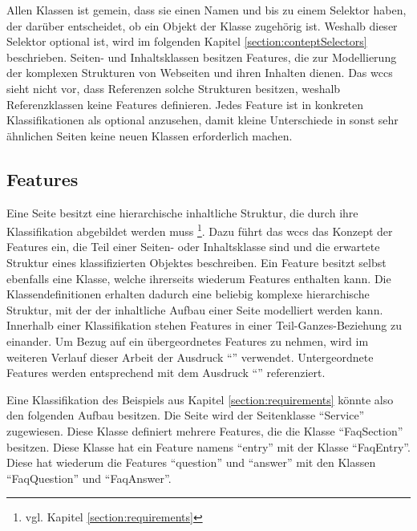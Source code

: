         Allen Klassen ist gemein, dass sie einen Namen und bis zu einem Selektor haben,
        der darüber entscheidet, ob ein Objekt der Klasse zugehörig ist.
        Weshalb dieser Selektor optional ist, wird im folgenden Kapitel \ref{section:conteptSelectors} beschrieben.
        Seiten- und Inhaltsklassen besitzen Features,
        die zur Modellierung der komplexen Strukturen von Webseiten und ihren Inhalten dienen.
        Das \gls{wccs} sieht nicht vor, dass Referenzen solche Strukturen besitzen,
        weshalb Referenzklassen keine Features definieren.
        Jedes Feature ist in konkreten Klassifikationen als optional anzusehen,
        damit kleine Unterschiede in sonst sehr ähnlichen Seiten keine neuen Klassen erforderlich machen.

    \subsection{Features}
        \label{section:conceptFeatures}
        Eine Seite besitzt eine hierarchische inhaltliche Struktur,
        die durch ihre Klassifikation abgebildet werden muss
        \footnote{vgl. Kapitel \ref{section:requirements}}.      
        Dazu führt das \gls{wccs} das Konzept der Features ein,
        die Teil einer Seiten- oder Inhaltsklasse sind und
        die erwartete Struktur eines klassifizierten Objektes beschreiben.
        Ein Feature besitzt selbst ebenfalls eine Klasse,
        welche ihrerseits wiederum Features enthalten kann.
        Die Klassendefinitionen erhalten dadurch eine beliebig komplexe hierarchische Struktur,
        mit der der inhaltliche Aufbau einer Seite modelliert werden kann.
        Innerhalb einer Klassifikation stehen Features in einer Teil-Ganzes-Beziehung zu einander.
        Um Bezug auf ein übergeordnetes Features zu nehmen,
        wird im weiteren Verlauf dieser Arbeit der Ausdruck "`\parentFeature"' verwendet.
        Untergeordnete Features werden entsprechend mit dem Ausdruck "`\childFeature"' referenziert.

        Eine Klassifikation des Beispiels aus Kapitel \ref{section:requirements} könnte also
        den folgenden Aufbau besitzen.
        Die Seite wird der Seitenklasse "`Service"' zugewiesen.
        Diese Klasse definiert mehrere Features, die die Klasse "`FaqSection"' besitzen.
        Diese Klasse hat ein Feature namens "`entry"' mit der Klasse "`FaqEntry"'.
        Diese hat wiederum die Features "`question"' und "`answer"' mit den Klassen
        "`FaqQuestion"' und "`FaqAnswer"'.

